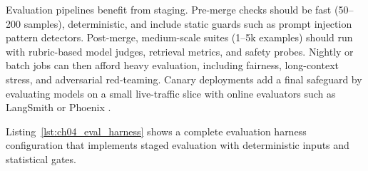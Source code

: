 Evaluation pipelines benefit from staging. Pre-merge checks should be fast (50--200 samples), deterministic, and include static guards such as prompt injection pattern detectors. Post-merge, medium-scale suites (1--5k examples) should run with rubric-based model judges, retrieval metrics, and safety probes. Nightly or batch jobs can then afford heavy evaluation, including fairness, long-context stress, and adversarial red-teaming. Canary deployments add a final safeguard by evaluating models on a small live-traffic slice with online evaluators such as LangSmith or Phoenix \cite{mlflow_llm_eval,phoenix_rag,trulens}.

Listing~\ref{lst:ch04_eval_harness} shows a complete evaluation harness configuration that implements staged evaluation with deterministic inputs and statistical gates.

